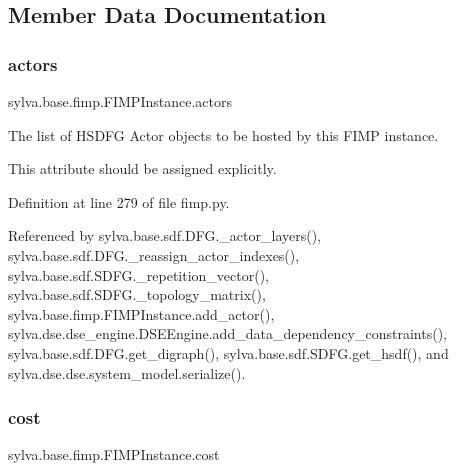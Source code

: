\subsection{Member Data Documentation}
\mbox{\label{classsylva_1_1base_1_1fimp_1_1_f_i_m_p_instance_add403074726c5a6637a9ea292d12811c}} 
\subsubsection{\texorpdfstring{actors}{actors}}
{\footnotesize\ttfamily sylva.\+base.\+fimp.\+F\+I\+M\+P\+Instance.\+actors}



The list of H\+S\+D\+FG Actor objects to be hosted by this F\+I\+MP instance. 

This attribute should be assigned explicitly. 

Definition at line 279 of file fimp.\+py.



Referenced by sylva.\+base.\+sdf.\+D\+F\+G.\+\_\+actor\+\_\+layers(), sylva.\+base.\+sdf.\+D\+F\+G.\+\_\+reassign\+\_\+actor\+\_\+indexes(), sylva.\+base.\+sdf.\+S\+D\+F\+G.\+\_\+repetition\+\_\+vector(), sylva.\+base.\+sdf.\+S\+D\+F\+G.\+\_\+topology\+\_\+matrix(), sylva.\+base.\+fimp.\+F\+I\+M\+P\+Instance.\+add\+\_\+actor(), sylva.\+dse.\+dse\+\_\+engine.\+D\+S\+E\+Engine.\+add\+\_\+data\+\_\+dependency\+\_\+constraints(), sylva.\+base.\+sdf.\+D\+F\+G.\+get\+\_\+digraph(), sylva.\+base.\+sdf.\+S\+D\+F\+G.\+get\+\_\+hsdf(), and sylva.\+dse.\+dse.\+system\+\_\+model.\+serialize().

\mbox{\label{classsylva_1_1base_1_1fimp_1_1_f_i_m_p_instance_abb77c89ca6b5831cc36d8cc6c25feeff}} 
\subsubsection{\texorpdfstring{cost}{cost}}
{\footnotesize\ttfamily sylva.\+base.\+fimp.\+F\+I\+M\+P\+Instance.\+cost}



